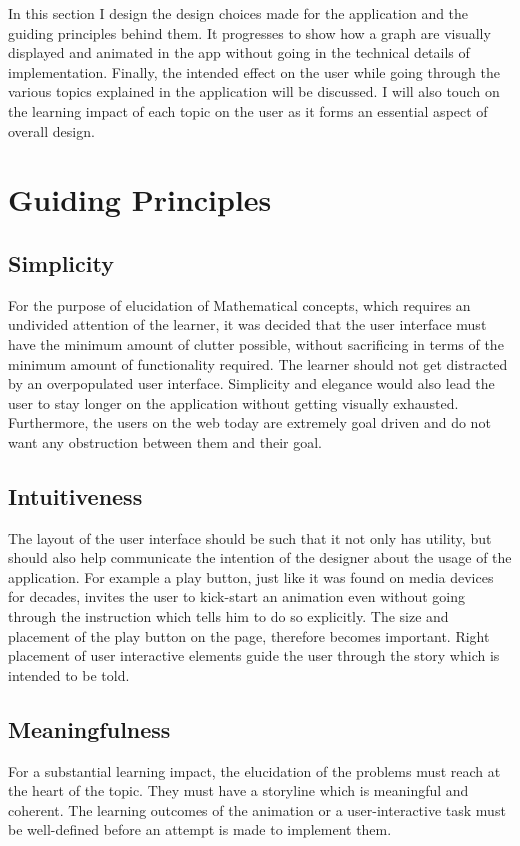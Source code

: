 \graphicspath{ {images/} }

In this section I design the design choices made for the application and the
guiding principles behind them. It progresses to show how a graph are visually
displayed and animated in the app without going in the technical details of
implementation. Finally, the intended effect on the user while going through
the various topics explained in the application will be discussed.  I will
also touch on the learning impact of each topic on the user as it forms an
essential aspect of overall design.

\section{Guiding Principles}

\subsection{Simplicity}
\label{design: simplicity}
For the purpose of elucidation of Mathematical concepts, which requires an
undivided attention of the learner, it was decided that the user interface must
have the minimum amount of clutter possible, without sacrificing in terms of the minimum
amount of functionality required. The learner should not get distracted by an
overpopulated user interface. Simplicity and elegance would also lead the user
to stay longer on the application without getting visually exhausted.
Furthermore, the users on the web today are extremely goal driven and do not want any
obstruction between them and their goal. \cite{Karvonen2000}

\subsection{Intuitiveness}
The layout of the user interface should be such that it not only has utility,
but should also help communicate the intention of the designer about the usage
of the application. For example a play button, just like it was found on media
devices for decades, invites the user to kick-start an animation even without
going through the instruction which tells him to do so explicitly. The size and
placement of the play button on the page, therefore becomes important. Right
placement of user interactive elements guide the user through the story which
is intended to be told.

\subsection{Meaningfulness}
For a substantial learning impact, the elucidation of the problems must reach at
the heart of the topic. They must have a storyline which is
meaningful and coherent. The learning outcomes of the animation or a
user-interactive task must be well-defined before an attempt is made to
implement them.

